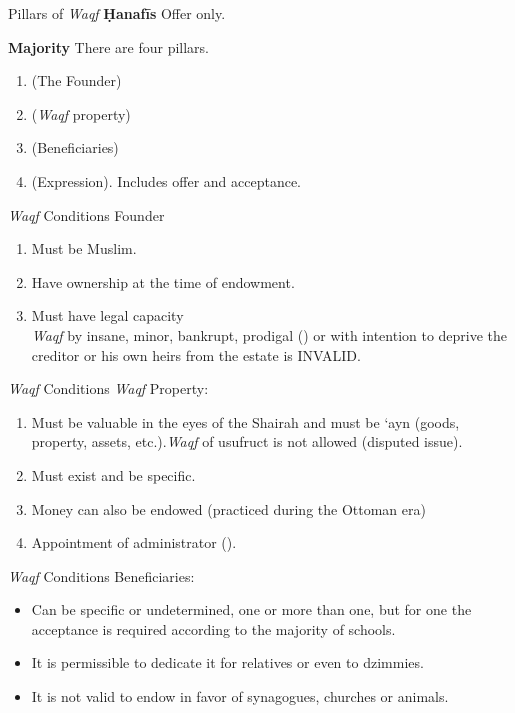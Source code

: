 \begin{frame}{Pillars of \textit{Waqf} \hfill {}}
\textbf{Ḥanafīs} Offer only.

\textbf{Majority} There are four pillars.

\begin{enumerate}
\item {} (The Founder)
\item {} (\textit{Waqf} property)
\item {} (Beneficiaries)
\item {} (Expression). Includes offer and acceptance.
\end{enumerate}
\end{frame}

\begin{frame}{\textit{Waqf} Conditions}
Founder {}
\begin{enumerate}
\item Must be Muslim.
\item Have ownership at the time of endowment.
\item Must have legal capacity\\\textit{Waqf} by insane, minor, bankrupt, prodigal () or with intention to deprive the creditor or his own heirs from the estate is \alert{INVALID}.
\end{enumerate}
\end{frame}

\begin{frame}{\textit{Waqf} Conditions}
 \textit{Waqf} Property:
\begin{enumerate}
  \item Must be valuable in the eyes of the Shairah and must be ‘ayn (goods, property, assets, etc.).\textit{Waqf} of usufruct is not allowed (disputed issue).
  \item Must exist and be specific.
  \item Money can also be endowed (practiced during the Ottoman era)
  \item Appointment of administrator ().
\end{enumerate}
\end{frame}

\begin{frame}{\textit{Waqf} Conditions}
 Beneficiaries:
\begin{itemize}
\item Can be specific or undetermined, one or more than one, but for one the acceptance is required according to the majority of schools.
\item It is permissible to dedicate it for relatives or even to dzimmies.
\item It is not valid to endow in favor of synagogues, churches or animals. 
\end{itemize}
\end{frame}

